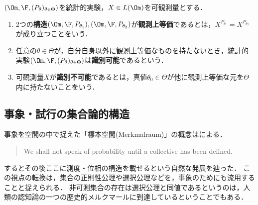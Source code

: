 \documentclass[uplatex,dvipdfmx]{jsreport}
\begin{document}
\begin{definition}
    $(\Om,\F,(P_\theta)_{\theta\in\Theta})$を統計的実験，$X\in L(\Om)$を可観測量とする．
    \begin{enumerate}
        \item 2つの\textbf{構造}$(\Om,\F,P_{\theta_1}),(\Om,\F,P_{\theta_2})$が\textbf{観測上等価}であるとは，$X^{P_{\theta_1}}=X^{P_{\theta_2}}$が成り立つことをいう．
        \item 任意の$\theta\in\Theta$が，自分自身以外に観測上等価なものを持たないとき，統計的実験$(\Om,\F,(P_\theta)_{\theta\in\Theta})$は\textbf{識別可能}であるという．
        \item 可観測量$X$が\textbf{識別不可能}であるとは，真値$\theta_0\in\Theta$が他に観測上等価な元を$\Theta$内に持たないことをいう．
    \end{enumerate}
\end{definition}

\subsection{事象・試行の集合論的構造}

\begin{tcolorbox}[colframe=ForestGreen, colback=ForestGreen!10!white,breakable,colbacktitle=ForestGreen!40!white,coltitle=black,fonttitle=\bfseries\sffamily,
title=「集合の公理」のもう一つの見方]
    事象を空間の中で捉えた「標本空間(Merkmalraum)」の概念は\cite{vonMises19}による．
    \begin{quote}
        We shall not speak of probability until a collective has been defined. \cite{vonMises-Probability-Statistics-and-Truth}
    \end{quote}
    するとその後ここに測度・位相の構造を載せるという自然な発展を辿った．
    この視点の転換は，集合の正則性公理や選択公理などを，事象のためにも流用することと捉えられる．
    非可測集合の存在は選択公理と同値であるというのは，人類の認知論の一つの歴史的メルクマールに到達しているということでもある．
\end{tcolorbox}
\end{document}
